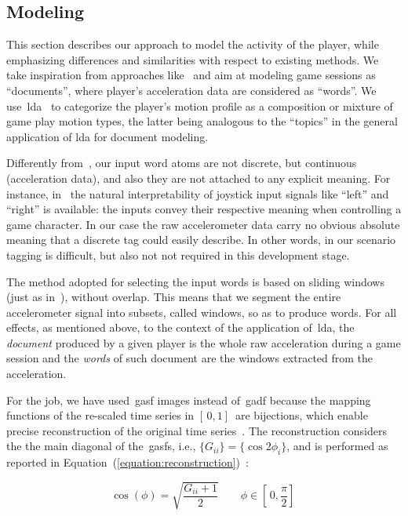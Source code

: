 \subsection{Modeling}
This section describes our approach to model the activity of the player, while emphasizing differences and similarities with respect to existing methods. We take inspiration from approaches like~\cite{smith_mining_2016, wang_encoding_2015, wang_imaging_2015} and aim at modeling game sessions as ``documents'', where player's acceleration data are considered as ``words''. We use~\gls{lda}~\cite{blei_latent_2003} to categorize the player's motion profile as a composition or mixture of game play motion types, the latter being analogous to the ``topics'' in the general application of \gls{lda} for document modeling.

Differently from~\cite{smith_mining_2016}, our input word atoms are not discrete, but continuous (acceleration data), and also they are not attached to any explicit meaning. For instance, in~\cite{smith_mining_2016} the natural interpretability of joystick input signals like ``left'' and ``right'' is available: the inputs convey their respective meaning when controlling a game character. In our case the raw accelerometer data carry no obvious absolute meaning that a discrete tag could easily describe. In other words, in our scenario tagging is difficult, but also not not required in this development stage.

The method adopted for selecting the input words is based on sliding windows (just as in~\cite{smith_mining_2016}), without overlap. This means that we segment the entire accelerometer signal into subsets, called windows, so as to produce words. For all effects, as mentioned above, to the context of the application of~\gls{lda}, the \textit{document} produced by a given player is the whole raw acceleration during a game session and the \textit{words} of such document are the windows extracted from the acceleration.

For the job, we have used~\gls{gasf} images instead of~\gls{gadf} because the mapping functions of the re-scaled time series in $[\,0,1]\,$ are bijections, which enable precise reconstruction of the original time series~\citep{wang_imaging_2015}. The reconstruction considers the the main diagonal of the~\gls{gasf}s, i.e., $\{G_{ii}\} = \{\cos{2\phi_{i}}\}$, and is performed as reported in Equation~(\ref{equation:reconstruction})~\cite{wang_imaging_2015}:

\begin{equation}\label{equation:reconstruction}
    \cos(\phi)=\sqrt{\frac{G_{ii}+1}{2}} \qquad \phi \in [\,0,\frac{\pi}{2}]\,
\end{equation}

